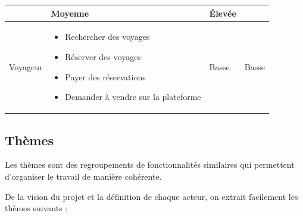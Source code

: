 \documentclass[12pt]{report}
\begin{document}
\begin{longtable}{|p{3cm}|p{5cm}|p{3cm}|p{3cm}|}
						&Moyenne &Élevée\\
						\hline
						Voyageur & 

						\begin{itemize}
							\item Rechercher des voyages
							\item Réserver des voyages
							\item Payer des réservations
							\item Demander à vendre sur la plateforme							
						\end{itemize}

						&Basse &Basse\\
						\hline
				    \end{longtable}


				\subsection{Thèmes}
				
				\hspace{15pt} Les thèmes sont des regroupements de fonctionnalités similaires qui permettent d'organiser le travail de manière cohérente. 
				
				De la vision du projet et la définition de chaque acteur, on extrait facilement les thèmes suivants :
				
\end{document}
